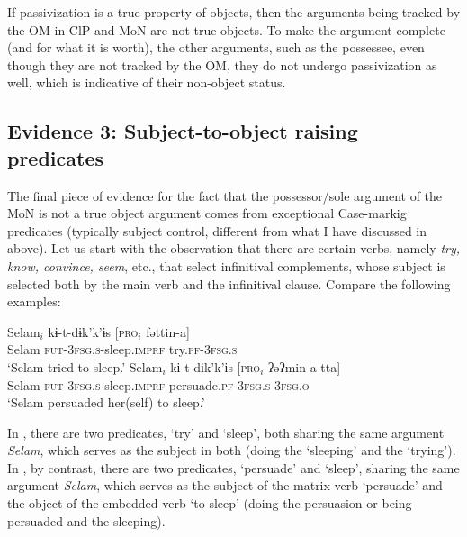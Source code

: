 \documentclass[output=paper]{langscibook}
\begin{document}
\noindent If passivization is a true property of objects, then the arguments being tracked by the OM in ClP and MoN are not true objects. To make the argument complete (and for what it is worth), the other arguments, such as the possessee, even though they are not tracked by the OM, they do not undergo passivization as well, which is indicative of their non-object status.


\ea\label{ex:Gebregziabher:passive2}
\z
\z

\subsection{Evidence 3: Subject-to-object raising predicates}

The final piece of evidence for the fact that the possessor/sole argument of the MoN is not a true object argument comes from exceptional Case-markig predicates (typically subject control, different from what I have discussed in  above). Let us start with the observation that there are certain verbs, namely \emph{try, know, convince, seem}, etc., that select infinitival complements, whose subject is selected both by the main verb and the infinitival clause. Compare the following examples:


\ea\label{ex:Gebregziabher:conv}
\ea\label{ex:Gebregziabher:conv1} 
\gll Selam$_i$ kɨ-t-dɨk'k'ɨs [{\scshape pro}$_i$ fəttin-a] \\
Selam {\scshape fut-3fsg.s}-sleep.{\scshape imprf} {} try.{\scshape pf-3fsg.s} \\
\glt `Selam tried to sleep.'
\ex\label{ex:Gebregziabher:conv2}   
\gll Selam$_i$ kɨ-t-dɨk'k'ɨs [{\scshape pro}$_i$ ʔəʔmin-a-tta] \\
Selam {\scshape fut-3fsg.s}-sleep.{\scshape imprf} {} persuade.{\scshape pf-3fsg.s-3fsg.o} \\
\glt `Selam persuaded her(self) to sleep.'
\z
\z


\noindent In , there are two predicates, `try' and `sleep', both sharing the same argument \emph{Selam}, which serves as the subject in both (doing the `sleeping' and the `trying').  
In , by contrast, there are two predicates, `persuade' and `sleep', sharing the same argument \emph{Selam}, which serves as the subject of the matrix verb `persuade' and the object of the embedded verb `to sleep' (doing the persuasion or being persuaded and the sleeping).
\end{document}
